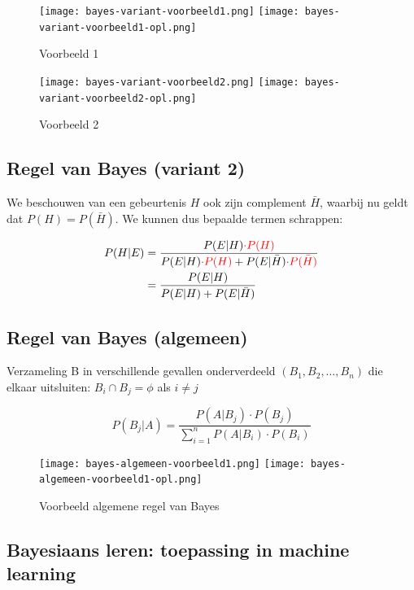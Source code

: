 \documentclass{article}
\begin{document}
\begin{figure}[H]
    \centering
    \texttt{[image: bayes-variant-voorbeeld1.png]}
    \texttt{[image: bayes-variant-voorbeeld1-opl.png]}
    \caption{Voorbeeld 1}
\end{figure}

\begin{figure}[H]
    \centering
    \texttt{[image: bayes-variant-voorbeeld2.png]}
    \texttt{[image: bayes-variant-voorbeeld2-opl.png]}
    \caption{Voorbeeld 2}
\end{figure}

\subsection{Regel van Bayes (variant 2)}

We beschouwen van een gebeurtenis $H$ ook zijn complement $\bar{H}$, 
waarbij nu geldt dat $P(H) = P(\bar{H})$. We kunnen dus bepaalde termen schrappen:


\begin{equation}
    \begin{aligned}
        P(H | E) & = \frac{P(E | H) \textcolor{red}{\cdot P(H)}}{P(E | H) \textcolor{red}{\cdot P(H)} + P(E | \bar{H}) \textcolor{red}{\cdot P(\bar{H})}}\\
        & = \frac{P(E | H)}{P(E | H) + P(E | \bar{H})}
    \end{aligned}
\end{equation}

\subsection{Regel van Bayes (algemeen)}

Verzameling B in verschillende gevallen onderverdeeld $(B_1, B_2, \dots, B_n)$ die elkaar
uitsluiten: $B_i \cap B_j = \phi$ als $i \neq j$

\begin{equation}
    P(B_j | A) = \frac{P(A | B_j) \cdot P(B_j)}{\sum_{i=1}^n P(A|B_i) \cdot P(B_i)}
\end{equation}

\begin{figure}[H]
    \centering
    \texttt{[image: bayes-algemeen-voorbeeld1.png]}
    \texttt{[image: bayes-algemeen-voorbeeld1-opl.png]}
    \caption{Voorbeeld algemene regel van Bayes}
\end{figure}

\subsection{Bayesiaans leren: toepassing in machine learning}
\end{document}
